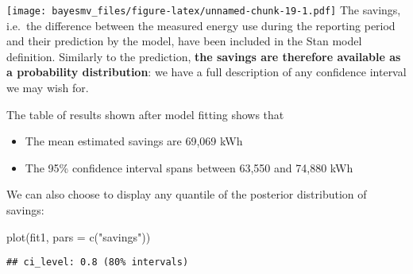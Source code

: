 \documentclass[
]{article}
\newenvironment{Shaded}{\begin{snugshade}}{\end{snugshade}}
\newcommand{\AttributeTok}[1]{\textcolor[rgb]{0.77,0.63,0.00}{#1}}
\newcommand{\FloatTok}[1]{\textcolor[rgb]{0.00,0.00,0.81}{#1}}
\newcommand{\FunctionTok}[1]{\textcolor[rgb]{0.00,0.00,0.00}{#1}}
\newcommand{\NormalTok}[1]{#1}
\newcommand{\SpecialCharTok}[1]{\textcolor[rgb]{0.00,0.00,0.00}{#1}}
\newcommand{\StringTok}[1]{\textcolor[rgb]{0.31,0.60,0.02}{#1}}
\providecommand{\tightlist}{%
  \setlength{\itemsep}{0pt}\setlength{\parskip}{0pt}}
\begin{document}
\begin{Shaded}
\end{Shaded}

\texttt{[image: bayesmv\_files/figure-latex/unnamed-chunk-19-1.pdf]}
The savings, i.e.~the difference between the measured energy use during the reporting period and their prediction by the model, have been included in the Stan model definition. Similarly to the prediction, \textbf{the savings are therefore available as a probability distribution}: we have a full description of any confidence interval we may wish for.

The table of results shown after model fitting shows that

\begin{itemize}
\tightlist
\item
  The mean estimated savings are 69,069 kWh
\item
  The 95\% confidence interval spans between 63,550 and 74,880 kWh
\end{itemize}

We can also choose to display any quantile of the posterior distribution of savings:

\begin{Shaded}
\begin{Highlighting}[]
\FunctionTok{plot}\NormalTok{(fit1, }\AttributeTok{pars =} \FunctionTok{c}\NormalTok{(}\StringTok{"savings"}\NormalTok{))}
\end{Highlighting}
\end{Shaded}

\begin{verbatim}
## ci_level: 0.8 (80% intervals)
\end{verbatim}
\end{document}
